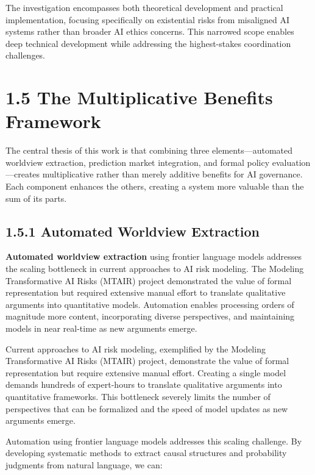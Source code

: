 \documentclass[
  11pt,
  letterpaper,
]{book}
\begin{document}
The investigation encompasses both theoretical development and practical
implementation, focusing specifically on existential risks from
misaligned AI systems rather than broader AI ethics concerns. This
narrowed scope enables deep technical development while addressing the
highest-stakes coordination challenges.

\section*{1.5 The Multiplicative Benefits
Framework}\label{sec-multiplicative-benefits}


The central thesis of this work is that combining three
elements---automated worldview extraction, prediction market
integration, and formal policy evaluation---creates multiplicative
rather than merely additive benefits for AI governance. Each component
enhances the others, creating a system more valuable than the sum of its
parts.

\subsection*{1.5.1 Automated Worldview
Extraction}\label{sec-automated-extraction}

\textbf{Automated worldview extraction} using frontier language models
addresses the scaling bottleneck in current approaches to AI risk
modeling. The Modeling Transformative AI Risks (MTAIR) project
demonstrated the value of formal representation but required extensive
manual effort to translate qualitative arguments into quantitative
models. Automation enables processing orders of magnitude more content,
incorporating diverse perspectives, and maintaining models in near
real-time as new arguments emerge.

Current approaches to AI risk modeling, exemplified by the Modeling
Transformative AI Risks (MTAIR) project, demonstrate the value of formal
representation but require extensive manual effort. Creating a single
model demands hundreds of expert-hours to translate qualitative
arguments into quantitative frameworks. This bottleneck severely limits
the number of perspectives that can be formalized and the speed of model
updates as new arguments emerge.

Automation using frontier language models addresses this scaling
challenge. By developing systematic methods to extract causal structures
and probability judgments from natural language, we can:
\end{document}
